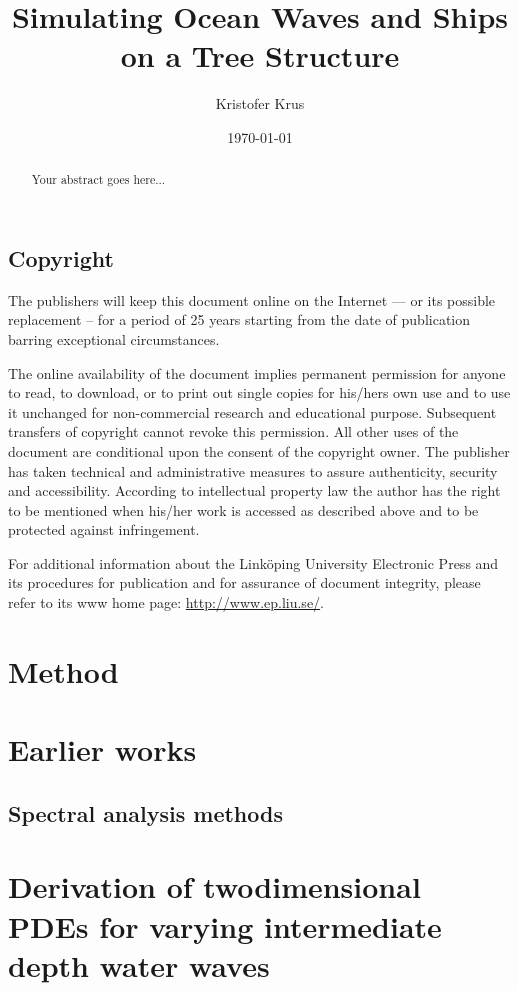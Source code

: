\documentclass{report}
\begin{document}
\begin{titlepage}
\title{Simulating Ocean Waves and Ships on a Tree Structure}
\author{Kristofer Krus}
\date{\today}
\maketitle
\end{titlepage}

\section*{Copyright}
The publishers will keep this document online on the Internet --- or its possible replacement -- for a period of 25 years starting from the date of publication barring exceptional circumstances.

The online availability of the document implies permanent permission for anyone to read, to download, or to print out single copies for his/hers own use and to use it unchanged for non-commercial research and educational purpose. Subsequent transfers of copyright cannot revoke this permission. All other uses of the document are conditional upon the consent of the copyright owner. The publisher has taken technical and administrative measures to assure authenticity, security and accessibility.
According to intellectual property law the author has the right to be mentioned when his/her work is accessed as described above and to be protected against infringement.

For additional information about the Linköping University Electronic Press and its procedures for publication and for assurance of document integrity, please refer to its www home page: \url{http://www.ep.liu.se/}.

\begin{abstract}
    Your abstract goes here...
\end{abstract}

\chapter{Method}

\chapter{Earlier works}

\section{Spectral analysis methods}

\appendix
\chapter{Derivation of twodimensional PDEs for varying intermediate depth water waves}
\end{document}

